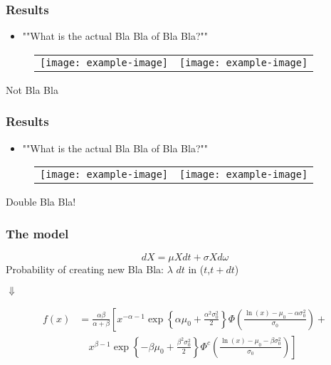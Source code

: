\documentclass{beamer}
\begin{document}
\begin{frame}
\frametitle{Results}
\begin{itemize}
\item ""What is the actual Bla Bla of Bla Bla?""
\end{itemize}
\begin{figure}[h]
\begin{center}
\begin{tabular}{cc}
\texttt{[image: example-image]} &
\texttt{[image: example-image]}
\end{tabular}
\end{center}
\end{figure}
\begin{center}
Not Bla Bla
\end{center}
\end{frame}

\begin{frame}
\frametitle{Results}
\begin{itemize}
\item ""What is the actual Bla Bla of Bla Bla?""
\end{itemize}
\begin{figure}[h]
\begin{center}
\begin{tabular}{cc}
\texttt{[image: example-image]} &
\texttt{[image: example-image]}
\end{tabular}
\end{center}
\end{figure}
\begin{center}
Double Bla Bla!
\end{center}
\end{frame}

\begin{frame}
\frametitle{The model}
\begin{equation*}
dX=\mu Xdt+\sigma Xd\omega
\end{equation*}
Probability of creating new Bla Bla: $\lambda$ $dt$ in ($t$,$t+dt$)
\begin{center}
$\Downarrow$
\end{center}
\begin{equation*}
\begin{split}
f(x)& =\frac{\alpha\beta}{\alpha+\beta} \left[x^{-\alpha-1}\exp\left\{\alpha\mu_{0}+\frac{\alpha^{2}\sigma_{0}^{2}}{2}\right\}
      \Phi\left(\frac{\ln(x)-\mu_{0}-\alpha\sigma_{0}^{2}}{\sigma_{0}}\right)\right. +\\
    & \quad \left.x^{\beta-1}\exp\left\{-\beta\mu_{0}+\frac{\beta^{2}\sigma_{0}^{2}}{2}\right\} \Phi^{c}\left(\frac{\ln(x)-\mu_{0}-\beta\sigma_{0}^{2}}{\sigma_{0}}\right)\right]
\end{split}
\end{equation*}
\end{frame}
\end{document}

